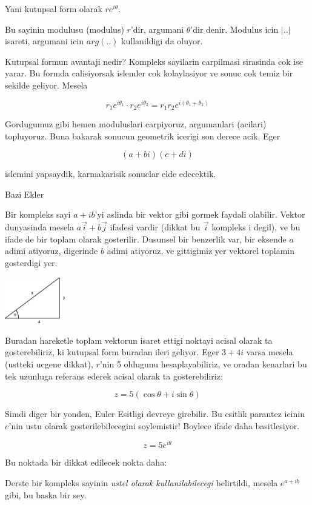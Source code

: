 \documentclass[12pt,fleqn]{article}\usepackage{../common}
\begin{document}
Yani kutupsal form olarak $re^{i\theta}$. 

Bu sayinin modulusu (modulus) $r$'dir, argumani $\theta$'dir denir. Modulus
icin $|..|$ isareti, argumani icin $arg(..)$ kullanildigi da oluyor. 

Kutupsal formun avantaji nedir? Kompleks sayilarin carpilmasi sirasinda cok
ise yarar. Bu formda calisiyorsak islemler cok kolaylasiyor ve sonuc cok
temiz bir sekilde geliyor. Mesela

\[ r_1 e^{i\theta_1} \cdot r_2 e^{i\theta_2} = r_1r_2 e^{i(\theta_1+\theta_2)}\]

Gordugumuz gibi hemen moduluslari carpiyoruz, argumanlari (acilari)
topluyoruz. Buna bakarak sonucun geometrik icerigi son derece acik. Eger 

\[ (a+bi)(c+di) \]

islemini yapsaydik, karmakarisik sonuclar elde edecektik.

Bazi Ekler 

Bir kompleks sayi $a+ib$'yi aslinda bir vektor gibi gormek faydali
olabilir. Vektor dunyasinda mesela $a\vec{i} + b\vec{j}$ ifadesi vardir
(dikkat bu $\vec{i}$ kompleks i degil), ve bu ifade de bir toplam olarak
gosterilir. Dusunsel bir benzerlik var, bir eksende $a$ adimi atiyoruz,
digerinde $b$ adimi atiyoruz, ve gittigimiz yer vektorel toplamin
gosterdigi yer.

\includegraphics[height=2cm]{345.png}

Buradan hareketle toplam vektorun isaret ettigi noktayi acisal olarak ta
gosterebiliriz, ki kutupsal form buradan ileri geliyor. Eger $3 + 4i$ varsa
mesela (ustteki ucgene dikkat), $r$'nin 5 oldugunu hesaplayabiliriz, ve
oradan kenarlari bu tek uzunluga referans ederek acisal olarak ta
gosterebiliriz:

\[ z = 5(\cos\theta + i \sin\theta ) \]

Simdi diger bir yonden, Euler Esitligi devreye girebilir. Bu esitlik
parantez icinin $e$'nin ustu olarak gosterilebilecegini soylemistir!
Boylece ifade daha basitlesiyor.

\[ z = 5e^{i\theta} \]

Bu noktada bir dikkat edilecek nokta daha:

Derste bir kompleks sayinin {\em ustel olarak kullanilabilecegi}
belirtildi, mesela $e^{a+ib}$ gibi, bu baska bir sey. 
\end{document}
